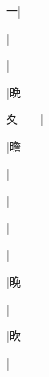 \begin{multicols}{2}
{{一}|{}\par
{\cjk{}{\cnsym{}　}{\cnsym{}　}{\cnsym{}　}}|{}\par
{\cjk{}{\cnsym{}　}{\cnsym{}　}{\cnsym{}　}}|{}\par
{\cjk{}{\cnsym{}　}{\cnsym{}　}{\cnsym{}　}}|{\cjk{}晩}\par
{\cjk{}夊{\cnsym{}　}{\cnsym{}　}}|{}\par
{\cjk{}{\cnsym{}　}{\cnsym{}　}{\cnsym{}　}}|{\cjk{}曕}\par
{\cjk{}{\cnsym{}　}{\cnsym{}　}{\cnsym{}　}}|{}\par
{\cjk{}{\cnsym{}　}{\cnsym{}　}{\cnsym{}　}}|{}\par
{\cjk{}{\cnsym{}　}{\cnsym{}　}{\cnsym{}　}}|{}\par
{\cjk{}{\cnsym{}　}{\cnsym{}　}{\cnsym{}　}}|{}\par
{\cjk{}{\cnsym{}　}{\cnsym{}　}{\cnsym{}　}}|{\cjk{}晚}\par
{\cjk{}{\cnsym{}　}{\cnsym{}　}{\cnsym{}　}}|{}\par
{\cjk{}{\cnsym{}　}{\cnsym{}　}{\cnsym{}　}}|{\cjk{}欥}\par
{}|{}\par
}
\end{multicols}
